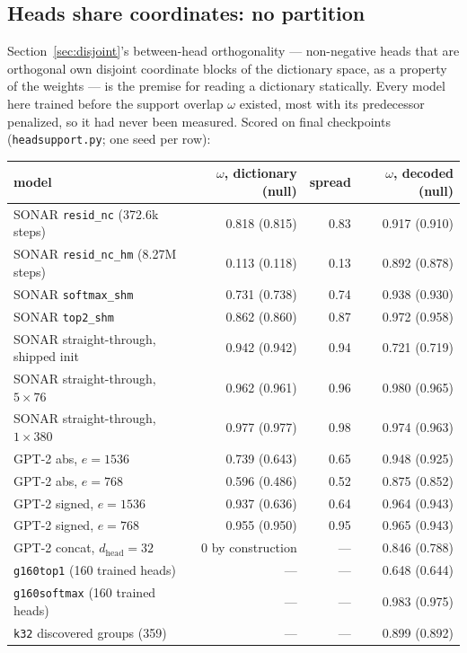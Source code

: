\subsection{Heads share coordinates: no partition}
\label{sec:support}

Section~\ref{sec:disjoint}'s between-head orthogonality --- non-negative
heads that are orthogonal own disjoint coordinate blocks of the dictionary
space, as a property of the weights --- is the premise for reading a
dictionary statically. Every model here trained before the support overlap
$\omega$ existed, most with its predecessor penalized, so it had never been
measured. Scored on final checkpoints (\texttt{headsupport.py}; one seed
per row):

\begin{center}\small\setlength{\tabcolsep}{4pt}
\begin{tabular}{@{}lrrr@{}}
\toprule
model & $\omega$, dictionary (null) & spread & $\omega$, decoded (null) \\
\midrule
SONAR \texttt{resid\_nc} (372.6k steps) & 0.818 (0.815) & 0.83 & 0.917 (0.910) \\
SONAR \texttt{resid\_nc\_hm} (8.27M steps) & 0.113 (0.118) & 0.13 & 0.892 (0.878) \\
SONAR \texttt{softmax\_shm} & 0.731 (0.738) & 0.74 & 0.938 (0.930) \\
SONAR \texttt{top2\_shm} & 0.862 (0.860) & 0.87 & 0.972 (0.958) \\
SONAR straight-through, shipped init & 0.942 (0.942) & 0.94 & 0.721 (0.719) \\
SONAR straight-through, $5\times76$ & 0.962 (0.961) & 0.96 & 0.980 (0.965) \\
SONAR straight-through, $1\times380$ & 0.977 (0.977) & 0.98 & 0.974 (0.963) \\
GPT-2 abs, $e{=}1536$ & 0.739 (0.643) & 0.65 & 0.948 (0.925) \\
GPT-2 abs, $e{=}768$ & 0.596 (0.486) & 0.52 & 0.875 (0.852) \\
GPT-2 signed, $e{=}1536$ & 0.937 (0.636) & 0.64 & 0.964 (0.943) \\
GPT-2 signed, $e{=}768$ & 0.955 (0.950) & 0.95 & 0.965 (0.943) \\
GPT-2 concat, $d_{\text{head}}{=}32$ & 0 by construction & --- & 0.846 (0.788) \\
\midrule
\texttt{g160top1} (160 trained heads) & --- & --- & 0.648 (0.644) \\
\texttt{g160softmax} (160 trained heads) & --- & --- & 0.983 (0.975) \\
\texttt{k32} discovered groups (359) & --- & --- & 0.899 (0.892) \\
\bottomrule
\end{tabular}
\end{center}

